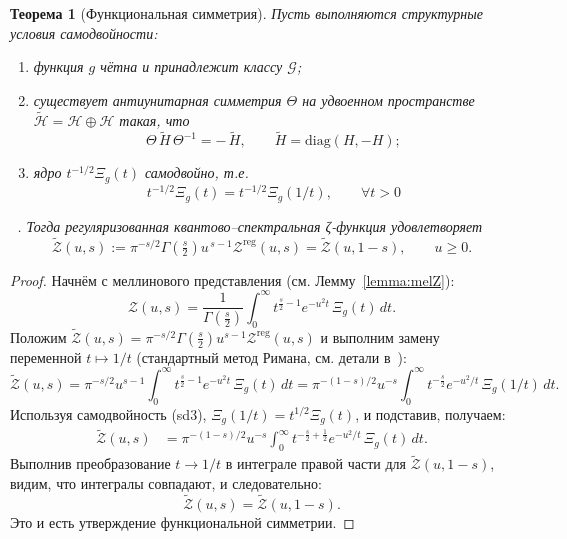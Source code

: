 \documentclass{article}
\numberwithin{equation}{section}
\theoremstyle{plain}
\newtheorem{theorem}{Теорема}
\theoremstyle{definition}
\theoremstyle{remark}
\def\infty{∞}\def\partial{∂}\def\sum{Σ}\def\int{∫}%
\begin{document}
\begin{theorem}[Функциональная симметрия]
\label{thm:functional-symmetry}
Пусть выполняются структурные условия самодвойности:
\begin{enumerate}
  \item[\textnormal{(sd1)}] функция $g$ чётна и принадлежит классу $\mathcal G$;
  \item[\textnormal{(sd2)}] существует антиунитарная симметрия $\Theta$ на удвоенном пространстве $\widetilde{\mathcal H}=\mathcal H\oplus\mathcal H$ такая, что
  \begin{equation}
  \Theta\,\widetilde H\,\Theta^{-1}=-\,\widetilde H, 
  \qquad \widetilde H=\mathrm{diag}(H,-H);
  \end{equation}
  \item[\textnormal{(sd3)}] ядро $t^{-1/2}\Xi_g(t)$ самодвойно, т.е.
  \begin{equation}
  t^{-1/2}\Xi_g(t)=t^{-1/2}\Xi_g(1/t),\qquad \forall t>0
  \end{equation}
\end{enumerate} ~\cite{Hecke1936}.
Тогда регуляризованная квантово–спектральная ζ-функция удовлетворяет
\begin{equation}
\boxed{
\widetilde{\mathcal Z}(u,s)
:=\pi^{-s/2}\Gamma\!\left(\tfrac{s}{2}\right)
u^{\,s-1}\mathcal Z^{\mathrm{reg}}(u,s)
=\widetilde{\mathcal Z}(u,1-s),
\qquad u\ge0.
}
\end{equation}
\end{theorem}

\begin{proof}
Начнём с меллинового представления (см. Лемму~\ref{lemma:melZ}):
\begin{equation}
\mathcal Z(u,s)
=\frac{1}{\Gamma(\tfrac s2)}
\int_0^\infty t^{\frac s2-1}e^{-u^2t}\,
\Xi_g(t)\,dt.
\end{equation}
Положим 
\(\widetilde{\mathcal Z}(u,s)
=\pi^{-s/2}\Gamma(\tfrac s2)u^{s-1}\mathcal Z^{\mathrm{reg}}(u,s)\)
и выполним замену переменной \(t\mapsto 1/t\) (стандартный метод Римана, см. детали в~\cite{IwaniecKowalski2004}):
\begin{equation}
\widetilde{\mathcal Z}(u,s)
=\pi^{-s/2}u^{s-1}\!\!
\int_0^\infty t^{\frac s2-1}e^{-u^2t}\,\Xi_g(t)\,dt
=\pi^{-(1-s)/2}u^{-s}\!\!
\int_0^\infty t^{-\frac s2}e^{-u^2/t}\,\Xi_g(1/t)\,dt.
\end{equation}
Используя самодвойность (sd3), \(\Xi_g(1/t)=t^{1/2}\Xi_g(t)\),
и подставив, получаем:
\begin{align}
\widetilde{\mathcal Z}(u,s)
&=\pi^{-(1-s)/2}u^{-s}\!
\int_0^\infty t^{-\frac s2+\frac12}e^{-u^2/t}\,\Xi_g(t)\,dt.
\end{align}
Выполнив преобразование \(t\to1/t\) в интеграле правой части для \(\widetilde{\mathcal Z}(u,1-s)\),
видим, что интегралы совпадают, и следовательно:
\begin{equation}
\widetilde{\mathcal Z}(u,s)=\widetilde{\mathcal Z}(u,1-s).
\end{equation}
Это и есть утверждение функциональной симметрии.
\end{proof}
\end{document}
